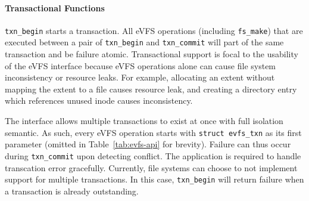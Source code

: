 \paragraph{Transactional Functions} \texttt{txn\_begin} starts a transaction. All eVFS operations (including \texttt{fs\_make}) that are executed between a pair of \texttt{txn\_begin} and \texttt{txn\_commit} will part of the same transaction and be failure atomic. Transactional support is focal to the usability of the eVFS interface because eVFS operations alone can cause file system inconsistency or resource leaks. For example, allocating an extent without mapping the extent to a file causes resource leak, and creating a directory entry which references unused inode causes inconsistency.

The interface allows multiple transactions to exist at once with full isolation semantic. As such, every eVFS operation starts with \texttt{struct evfs\_txn} as its first parameter (omitted in Table~\ref{tab:evfs-api} for brevity). Failure can thus occur during \texttt{txn\_commit} upon detecting conflict. The application is required to handle transcation error gracefully. Currently, file systems can choose to not implement support for multiple transactions. In this case, \texttt{txn\_begin} will return failure when a transaction is already outstanding.

